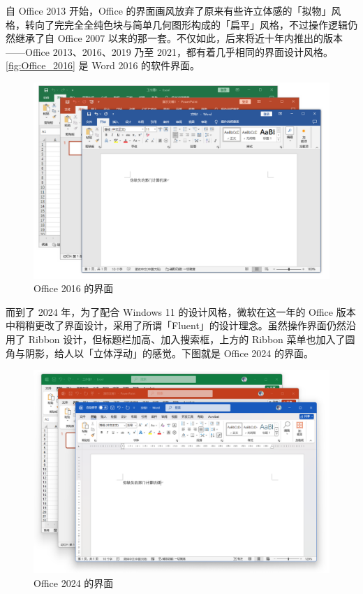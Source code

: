 自 Office 2013 开始，Office 的界面画风放弃了原来有些许立体感的「拟物」风格，转向了完完全全纯色块与简单几何图形构成的「扁平」风格，不过操作逻辑仍然继承了自 Office 2007 以来的那一套。不仅如此，后来将近十年内推出的版本——Office 2013、2016、2019 乃至 2021，都有着几乎相同的界面设计风格。\autoref{fig:Office_2016} 是 Word 2016 的软件界面。

\begin{figure}[htb!]
  \centering
  \includegraphics[width=.82\textwidth]{assets/software/Office_2016.png}
  \caption{Office 2016 的界面}
  \label{fig:Office_2016}
\end{figure}

而到了 2024 年，为了配合 Windows 11 的设计风格，微软在这一年的 Office 版本中稍稍更改了界面设计，采用了所谓「Fluent」的设计理念。虽然操作界面仍然沿用了 Ribbon 设计，但标题栏加高、加入搜索框，上方的 Ribbon 菜单也加入了圆角与阴影，给人以「立体浮动」的感觉。下图就是 Office 2024 的界面。

\begin{figure}[htb!]
  \centering
  \includegraphics[width=.82\textwidth]{assets/software/Office_2024.png}
  \caption{Office 2024 的界面}
  \label{fig:Office_2024}
\end{figure}

